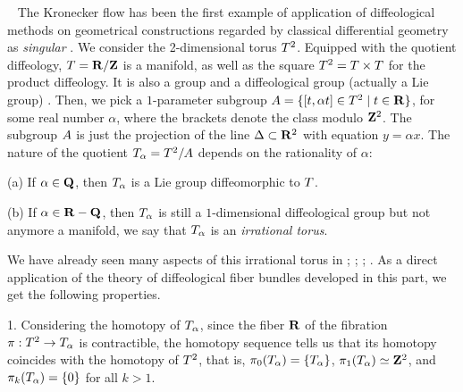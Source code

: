 \begin{article}%
  \label{The-Kronecker-flows-as-diffeological-fibrations}~
  The Kronecker flow has been the first example of application of diffeological methods on geometrical constructions regarded by classical differential geometry as {\em singular} \cite{DI83}.
  We consider the 2-dimensional torus $T^2$.
  Equipped with the quotient diffeology,
  $T = {\mathbf R}/{\mathbf Z}$ is a manifold,
  as well as the square $T^2 = T \times T$ for the product diffeology.
  It is also a group and a diffeological group (actually a Lie group) .
  Then,
  we pick a $1$-parameter subgroup $A = \{ \left[t,\alpha t\right] \in T^2 \mid t \in {\mathbf R} \}$,
  for some real number $\alpha$,
  where the brackets denote the class modulo ${\mathbf Z}^2$.
  The subgroup $A$ is just the projection of the line $\Delta \subset {\mathbf R}^2$ with equation $y = \alpha x$.
  The nature of the quotient $T_\alpha = T^2/A$ depends on the rationality of $\alpha$:
  
  (a) If $\alpha \in {\mathbf Q}$,
  then $T_\alpha$ is a Lie group diffeomorphic to $T$.
  
  (b) If $\alpha \in {\mathbf R} - {\mathbf Q}$,
  then $T_\alpha$ is still a $1$-dimensional diffeological group but not anymore a manifold,
  we say that $T_\alpha$ is an {\em irrational torus}.
  
  We have already seen many aspects of this irrational torus in ;
  ;
  ;
  .
  As a direct application of the theory of diffeological fiber bundles developed in this part,
  we get the following properties.
  
  1. Considering the homotopy of $T_\alpha$,
  since the fiber ${\mathbf R}$ of the fibration $\pi : T^2 \to T_\alpha$ is contractible,
  the homotopy sequence  tells us that its homotopy coincides with the homotopy of $T^2$,
  that is,
  $\pi_0(T_\alpha) = \{T_\alpha\}$,
  $\pi_1(T_\alpha) \simeq {\mathbf Z}^2$,
  and $\pi_k(T_\alpha) = \{0\}$ for all $k > 1$.
  

\end{article}
